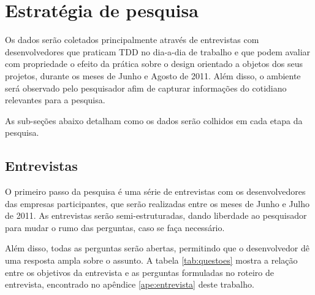 \section{Estratégia de pesquisa} 
\label{sec:planejamento-estrategia}


Os dados serão coletados principalmente através de entrevistas com
desenvolvedores que praticam TDD no dia-a-dia de trabalho e que podem avaliar
com propriedade o efeito da prática sobre o design orientado a objetos dos seus 
projetos, durante os meses de Junho e Agosto de 2011. 
Além disso, o ambiente será observado pelo pesquisador afim de capturar
informações do cotidiano relevantes para a pesquisa.

As sub-seções abaixo detalham como os dados serão colhidos em cada etapa da pesquisa.

\subsection{Entrevistas}
\label{sec:planejamento-estrategia-entrevistas}

O primeiro passo da pesquisa é uma série de entrevistas com os desenvolvedores 
das empresas participantes, que serão realizadas entre os meses de Junho e
Julho de 2011. As entrevistas serão semi-estruturadas, dando liberdade ao
pesquisador para mudar o rumo das perguntas, caso se faça necessário.

Além disso, todas as perguntas serão abertas, permitindo que o desenvolvedor dê
uma resposta ampla sobre o assunto. A tabela \ref{tab:questoes} mostra a
relação entre os objetivos da entrevista e as perguntas formuladas no roteiro de
entrevista, encontrado no apêndice \ref{ape:entrevista} deste trabalho.

